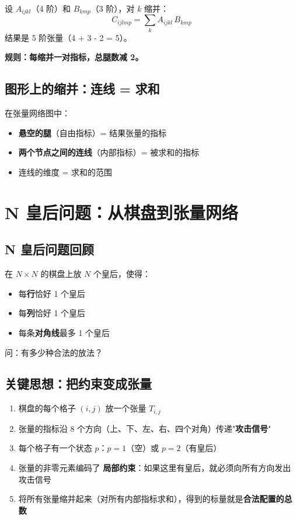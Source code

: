 \documentclass[12pt,a4paper]{article}
\begin{document}
\begin{exbox}[例子3：高阶张量缩并]
设 $A_{ijkl}$（4 阶）和 $B_{kmp}$（3 阶），对 $k$ 缩并：
$$C_{ijlmp} = \sum_{k} A_{ijkl} \, B_{kmp}$$
结果是 5 阶张量（4 + 3 - 2 = 5）。

\textbf{规则：每缩并一对指标，总腿数减 2。}
\end{exbox}

\subsection{图形上的缩并：连线 = 求和}

\begin{sumbox}[核心规则]
在张量网络图中：
\begin{itemize}
  \item \textbf{悬空的腿}（自由指标）= 结果张量的指标
  \item \textbf{两个节点之间的连线}（内部指标）= 被求和的指标
  \item 连线的维度 = 求和的范围
\end{itemize}
\end{sumbox}


\section{N 皇后问题：从棋盘到张量网络}

\subsection{N 皇后问题回顾}

在 $N \times N$ 的棋盘上放 $N$ 个皇后，使得：
\begin{itemize}
  \item 每\textbf{行}恰好 1 个皇后
  \item 每\textbf{列}恰好 1 个皇后
  \item 每条\textbf{对角线}最多 1 个皇后
\end{itemize}

问：有多少种合法的放法？

\subsection{关键思想：把约束变成张量}

\begin{keybox}[核心映射]
\begin{enumerate}
  \item 棋盘的每个格子 $(i,j)$ 放一个张量 $T_{i,j}$
  \item 张量的指标沿 8 个方向（上、下、左、右、四个对角）传递"\textbf{攻击信号}"
  \item 每个格子有一个状态 $p$：$p=1$（空）或 $p=2$（有皇后）
  \item 张量的非零元素编码了 \textbf{局部约束}：如果这里有皇后，就必须向所有方向发出攻击信号
  \item 将所有张量缩并起来（对所有内部指标求和），得到的标量就是\textbf{合法配置的总数}
\end{enumerate}
\end{keybox}
\end{document}
